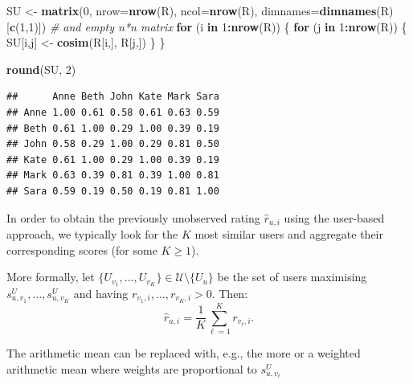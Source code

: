 \documentclass[10pt,b5paper,krantz1]{krantz}
\newenvironment{Shaded}{\begin{snugshade}}{\end{snugshade}}
\newcommand{\CommentTok}[1]{\textcolor[rgb]{0.37,0.37,0.37}{\textit{#1}}}
\newcommand{\ControlFlowTok}[1]{\textcolor[rgb]{0.27,0.27,0.27}{\textbf{#1}}}
\newcommand{\DataTypeTok}[1]{\textcolor[rgb]{0.27,0.27,0.27}{#1}}
\newcommand{\DecValTok}[1]{\textcolor[rgb]{0.06,0.06,0.06}{#1}}
\newcommand{\KeywordTok}[1]{\textcolor[rgb]{0.27,0.27,0.27}{\textbf{#1}}}
\newcommand{\NormalTok}[1]{#1}
\newcommand{\OperatorTok}[1]{\textcolor[rgb]{0.43,0.43,0.43}{\textbf{#1}}}
\newcommand{\StringTok}[1]{\textcolor[rgb]{0.5,0.5,0.5}{#1}}
\providecommand{\tightlist}{%
  \setlength{\itemsep}{0pt}\setlength{\parskip}{0pt}}
\begin{document}
\begin{Shaded}
\begin{Highlighting}[]
\NormalTok{SU <-}\StringTok{ }\KeywordTok{matrix}\NormalTok{(}\DecValTok{0}\NormalTok{, }\DataTypeTok{nrow=}\KeywordTok{nrow}\NormalTok{(R), }\DataTypeTok{ncol=}\KeywordTok{nrow}\NormalTok{(R),}
    \DataTypeTok{dimnames=}\KeywordTok{dimnames}\NormalTok{(R)[}\KeywordTok{c}\NormalTok{(}\DecValTok{1}\NormalTok{,}\DecValTok{1}\NormalTok{)]) }\CommentTok{# and empty n*n matrix}
\ControlFlowTok{for}\NormalTok{ (i }\ControlFlowTok{in} \DecValTok{1}\OperatorTok{:}\KeywordTok{nrow}\NormalTok{(R)) \{}
    \ControlFlowTok{for}\NormalTok{ (j }\ControlFlowTok{in} \DecValTok{1}\OperatorTok{:}\KeywordTok{nrow}\NormalTok{(R)) \{}
\NormalTok{        SU[i,j] <-}\StringTok{ }\KeywordTok{cosim}\NormalTok{(R[i,], R[j,])}
\NormalTok{    \}}
\NormalTok{\}}
\end{Highlighting}
\end{Shaded}

\begin{Shaded}
\begin{Highlighting}[]
\KeywordTok{round}\NormalTok{(SU, }\DecValTok{2}\NormalTok{)}
\end{Highlighting}
\end{Shaded}

\begin{verbatim}
##      Anne Beth John Kate Mark Sara
## Anne 1.00 0.61 0.58 0.61 0.63 0.59
## Beth 0.61 1.00 0.29 1.00 0.39 0.19
## John 0.58 0.29 1.00 0.29 0.81 0.50
## Kate 0.61 1.00 0.29 1.00 0.39 0.19
## Mark 0.63 0.39 0.81 0.39 1.00 0.81
## Sara 0.59 0.19 0.50 0.19 0.81 1.00
\end{verbatim}

In order to obtain the previously unobserved
rating \(\hat{r}_{u,i}\) using the user-based approach, we typically
look for the \(K\) most similar users and aggregate their corresponding
scores (for some \(K\ge 1\)).

More formally, let \(\{U_{v_1},\dots,U_{v_K}\}\in\mathcal{U}\setminus\{U_u\}\) be the set
of users maximising \(s^U_{u, v_1}, \dots, s^U_{u, v_K}\)
and having \(r_{v_1, i},\dots,r_{v_K, i}>0\).
Then:
\[
\hat{r}_{u,i} = \frac{1}{K} \sum_{\ell=1}^K r_{v_\ell, i}.
\]

\begin{description}
\tightlist
\item[Remark.]
The arithmetic mean can be replaced with, e.g.,
the more or a weighted arithmetic mean where weights are proportional to \(s^U_{u, v_\ell}\)
\end{description}
\end{document}
